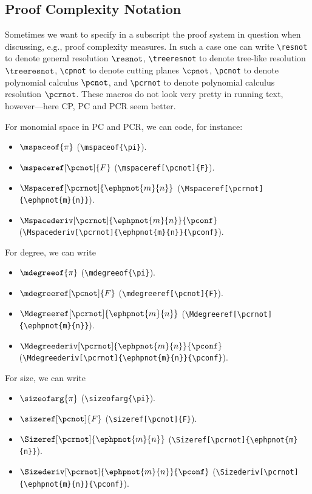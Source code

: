 \subsection{Proof Complexity Notation}


Sometimes we want to specify in a subscript the proof system in question when
discussing, e.g., proof complexity measures. In such a case one can write
\verb+\resnot+
to denote general resolution
$\resnot$,
\verb+\treeresnot+
to denote tree-like resolution
$\treeresnot$,
\verb+\cpnot+
to denote cutting planes
$\cpnot$,
\verb+\pcnot+
to denote polynomial calculus
$\pcnot$,
and
\verb+\pcrnot+
to denote polynomial calculus resolution
$\pcrnot$.
These macros do not look very pretty in running text, however---here
CP, PC and PCR seem better.

For monomial space in PC and PCR, we can code, for instance:
\begin{itemize}
\item 
$\mspaceof{\pi}$
(\verb+\mspaceof{\pi}+).

\item
$\mspaceref[\pcnot]{F}$
(\verb+\mspaceref[\pcnot]{F}+).

\item
$\Mspaceref[\pcrnot]{\ephpnot{m}{n}}$
(\verb+\Mspaceref[\pcrnot]{\ephpnot{m}{n}}+).

\item
$\Mspacederiv[\pcrnot]{\ephpnot{m}{n}}{\pconf}$
(\verb+\Mspacederiv[\pcrnot]{\ephpnot{m}{n}}{\pconf}+).

\end{itemize}



For degree, we can write
\begin{itemize}
\item 
$\mdegreeof{\pi}$
(\verb+\mdegreeof{\pi}+).

\item
$\mdegreeref[\pcnot]{F}$
(\verb+\mdegreeref[\pcnot]{F}+).

\item
$\Mdegreeref[\pcrnot]{\ephpnot{m}{n}}$
(\verb+\Mdegreeref[\pcrnot]{\ephpnot{m}{n}}+).

\item
$\Mdegreederiv[\pcrnot]{\ephpnot{m}{n}}{\pconf}$
(\verb+\Mdegreederiv[\pcrnot]{\ephpnot{m}{n}}{\pconf}+).
\end{itemize}

For size, we can write
\begin{itemize}
\item 
$\sizeofarg{\pi}$
(\verb+\sizeofarg{\pi}+).

\item
$\sizeref[\pcnot]{F}$
(\verb+\sizeref[\pcnot]{F}+).

\item
$\Sizeref[\pcrnot]{\ephpnot{m}{n}}$
(\verb+\Sizeref[\pcrnot]{\ephpnot{m}{n}}+).

\item
$\Sizederiv[\pcrnot]{\ephpnot{m}{n}}{\pconf}$
(\verb+\Sizederiv[\pcrnot]{\ephpnot{m}{n}}{\pconf}+).

\end{itemize}



